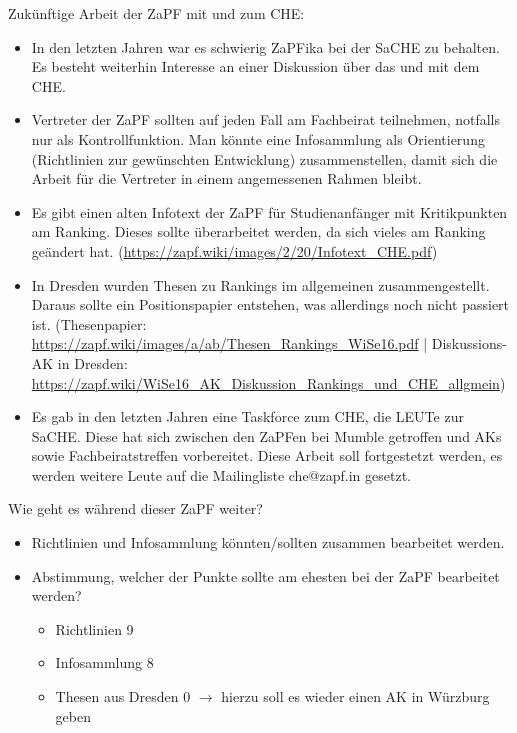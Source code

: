       Zukünftige Arbeit der ZaPF mit und zum CHE:
      \begin{itemize}
        \item In den letzten Jahren war es schwierig ZaPFika bei der SaCHE zu behalten. Es besteht weiterhin Interesse an einer Diskussion über das und mit dem CHE.
        \item Vertreter der ZaPF sollten auf jeden Fall am Fachbeirat teilnehmen, notfalls nur als Kontrollfunktion. Man könnte eine Infosammlung als Orientierung (Richtlinien zur gewünschten Entwicklung) zusammenstellen, damit sich die Arbeit für die Vertreter in einem angemessenen Rahmen bleibt.
        \item Es gibt einen alten Infotext der ZaPF für Studienanfänger mit Kritikpunkten am Ranking. Dieses sollte überarbeitet werden, da sich vieles am Ranking geändert hat. (\url{https://zapf.wiki/images/2/20/Infotext_CHE.pdf})
        \item In Dresden wurden Thesen zu Rankings im allgemeinen zusammengestellt. Daraus sollte ein Positionspapier entstehen, was allerdings noch nicht passiert ist. (Thesenpapier: \url{https://zapf.wiki/images/a/ab/Thesen_Rankings_WiSe16.pdf} | Diskussions-AK in Dresden: \url{https://zapf.wiki/WiSe16_AK_Diskussion_Rankings_und_CHE_allgmein})
        \item Es gab in den letzten Jahren eine Taskforce zum CHE, die LEUTe zur SaCHE. Diese hat sich zwischen den ZaPFen bei Mumble getroffen und AKs sowie Fachbeiratstreffen vorbereitet. Diese Arbeit soll fortgestetzt werden, es werden weitere Leute auf die Mailingliste che@zapf.in gesetzt.
      \end{itemize}

      Wie geht es während dieser ZaPF weiter?
      \begin{itemize}
        \item Richtlinien und Infosammlung könnten/sollten zusammen bearbeitet werden.
        \item Abstimmung, welcher der Punkte sollte am ehesten bei der ZaPF bearbeitet werden?
          \begin{itemize}
            \item Richtlinien 9
            \item Infosammlung 8
            \item Thesen aus Dresden 0 $\rightarrow$ hierzu soll es wieder einen AK in Würzburg geben
          \end{itemize}
      \end{itemize}

